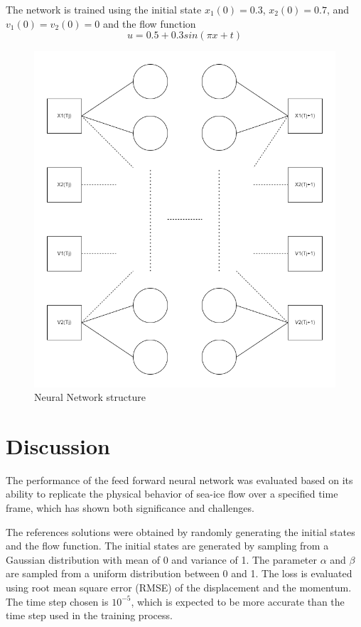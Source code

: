 \documentclass[12pt, a4paper]{article}
\begin{document}
The network is trained using the initial state
$x_1(0) = 0.3$, $x_2(0) = 0.7$, and $v_1(0) = v_2(0) = 0$
and the flow function
$$u = 0.5 + 0.3 sin(\pi x + t)$$

\begin{figure}
    \centering
    \includegraphics[scale=0.3]{../NN_graph.png}
    \caption[]{Neural Network structure}
    \label{fig:neural_network}
\end{figure}

\section{Discussion}
The performance of the feed forward neural network was evaluated based on its ability to replicate the physical behavior of sea-ice flow over a specified time frame, which has shown both significance and challenges. 

The references solutions were obtained by randomly generating the initial states and the flow function.
The initial states are generated by sampling from a Gaussian distribution with mean of 0 and variance of 1. The parameter $\alpha$ and $\beta$ are sampled from a uniform distribution between 0 and 1. The loss is evaluated using root mean square error (RMSE) of the displacement and the momentum. The time step chosen is $10^{-5}$, which is expected to be more accurate than the time step used in the training process.
\end{document}
